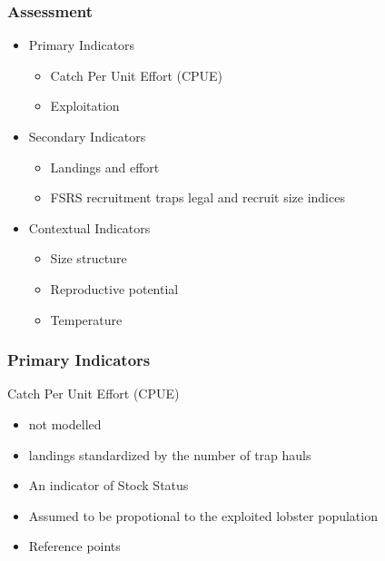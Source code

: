 \documentclass{beamer}
\begin{document}
\begin{frame}
\frametitle{Assessment}
\begin{itemize}
\item Primary Indicators 
\setlength\itemsep{1em}    
\begin{itemize}
\item Catch Per Unit Effort (CPUE)
\item Exploitation
\end{itemize}
\item Secondary Indicators 
\begin{itemize}
\item Landings and effort
\item FSRS recruitment traps legal and recruit size indices
\end{itemize}
\item Contextual Indicators
\begin{itemize}
\item Size structure
\item Reproductive potential
\item Temperature
\end{itemize}
\end{itemize}

\end{frame}



\begin{frame}
\frametitle{Primary Indicators}
Catch Per Unit Effort (CPUE)
\begin{itemize}
\item not modelled 
\item landings standardized by the number of trap hauls 
\item An indicator of Stock Status 
\item Assumed to be propotional to the exploited lobster population 
\item Reference points 
\end{itemize}
\end{frame}
\end{document}

